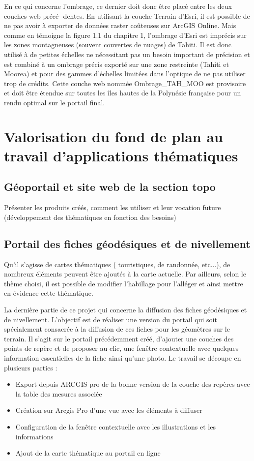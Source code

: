 En ce qui concerne l’ombrage, ce dernier doit donc être placé entre les deux couches web précé- dentes. En utilisant la couche Terrain d’Esri, il est possible de ne pas avoir à exporter de données raster coûteuses sur ArcGIS Online. Mais comme en témoigne la figure 1.1 du chapitre 1, l’ombrage d’Esri est imprécis sur les zones montagneuses (souvent couvertes de nuages) de Tahiti. Il est donc utilisé à de petites échelles ne nécessitant pas un besoin important de précision et est combiné à un ombrage précis exporté sur une zone restreinte (Tahiti et Moorea) et pour des gammes d’échelles limitées dans l’optique de ne pas utiliser trop de crédits. Cette couche web nommée Ombrage\_TAH\_MOO est provisoire et doit être étendue sur toutes les îles hautes de la Polynésie française pour un rendu optimal sur le portail final. 



\section{Valorisation du fond de plan au travail d'applications thématiques}

\subsection{Géoportail et site web de la section topo}
{\color{magenta} Présenter les produits créés, comment les utiliser et leur vocation future (développement des thématiques en fonction des besoins)}

\subsection{Portail des fiches géodésiques et de nivellement}


 Qu'il s'agisse de cartes thématiques ( touristiques, de randonnée, etc...), de nombreux éléments peuvent être ajoutés à la carte actuelle. Par ailleurs, selon le thème choisi, il est possible de modifier l'habillage pour l'alléger et ainsi mettre en évidence cette thématique.

La dernière partie de ce projet qui concerne la diffusion des fiches géodésiques et de nivellement. L'objectif est de réaliser une version du portail qui soit spécialement consacrée à la diffusion de ces fiches pour les géomètres sur le terrain.
Il s'agit sur le portail précédemment créé, d'ajouter une couches des points de repère et de proposer au clic, une fenêtre contextuelle avec quelques information essentielles de la fiche ainsi qu'une photo. Le travail se découpe en plusieurs parties : 
\begin{itemize}
    \item Export depuis ARCGIS pro de la bonne version de la couche des repères avec la table des mesures associée
    \item Création sur Arcgis Pro d'une vue avec les éléments à diffuser
    \item Configuration de la fenêtre contextuelle avec les illustrations et les informations
    \item Ajout de la carte thématique au portail en ligne
\end{itemize}

